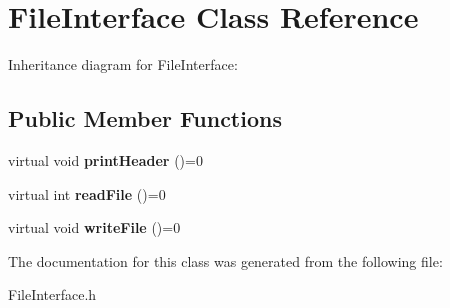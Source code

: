 \hypertarget{classFileInterface}{}\section{File\+Interface Class Reference}
\label{classFileInterface}


Inheritance diagram for File\+Interface\+:
\subsection*{Public Member Functions}
\begin{DoxyCompactItemize}
\item 
\mbox{\label{classFileInterface_acfd092493ecf4f466d57721fbfdd8b23}} 
virtual void {\bfseries print\+Header} ()=0
\item 
\mbox{\label{classFileInterface_ad6a8364f2255b7d724622eb8828b2c1c}} 
virtual int {\bfseries read\+File} ()=0
\item 
\mbox{\label{classFileInterface_a46344a063894f43e2594f4dca786756a}} 
virtual void {\bfseries write\+File} ()=0
\end{DoxyCompactItemize}


The documentation for this class was generated from the following file\+:\begin{DoxyCompactItemize}
\item 
File\+Interface.\+h\end{DoxyCompactItemize}
